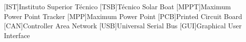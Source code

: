 



\begin{acronym}[H.264/SVC]

    [IST]{Instituto Superior T\'ecnico}
    [TSB]{Técnico Solar Boat}
    [MPPT]{Maximum Power Point Tracker}
    [MPP]{Maximum Power Point}
    [PCB]{Printed Circuit Board}
    [CAN]{Controller Area Network}
    [USB]{Universal Serial Bus}
    [GUI]{Graphical User Interface}

\end{acronym}






